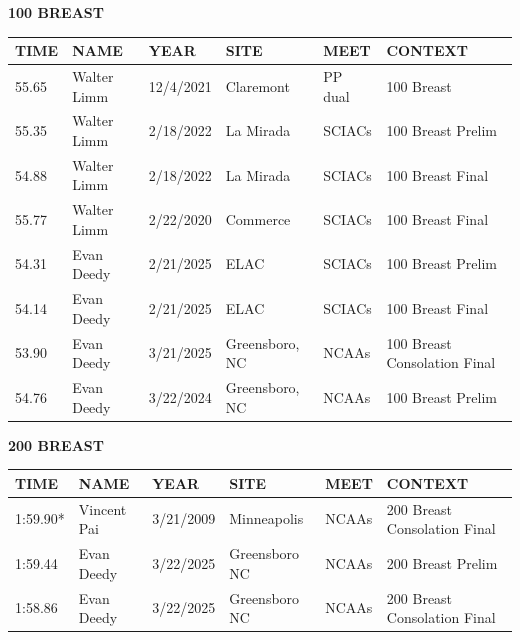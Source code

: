 \begin{table}[H]
\centering
\begin{minipage}[t]{0.48\textwidth}
\centering
\textbf{100 BREAST}\\[0.1cm]
\begin{tabular}{@{}p{1.8cm}p{2.8cm}p{1.2cm}p{1.4cm}p{1.4cm}p{2.0cm}@{}}
\hline
    \textbf{TIME} & \textbf{NAME} & \textbf{YEAR} & \textbf{SITE} & \textbf{MEET} & \textbf{CONTEXT} \\
\hline
    55.65 & Walter Limm & 12/4/2021 & Claremont & PP dual & 100 Breast \\
    55.35 & Walter Limm & 2/18/2022 & La Mirada & SCIACs & 100 Breast Prelim \\
    54.88 & Walter Limm & 2/18/2022 & La Mirada & SCIACs & 100 Breast Final \\
    55.77 & Walter Limm & 2/22/2020 & Commerce & SCIACs & 100 Breast Final \\
    54.31 & Evan Deedy & 2/21/2025 & ELAC & SCIACs & 100 Breast Prelim \\
    54.14 & Evan Deedy & 2/21/2025 & ELAC & SCIACs & 100 Breast Final \\
    53.90 & Evan Deedy & 3/21/2025 & Greensboro, NC & NCAAs & 100 Breast Consolation Final \\
    54.76 & Evan Deedy & 3/22/2024 & Greensboro, NC & NCAAs & 100 Breast Prelim \\
\hline
\end{tabular}
\end{minipage}\hfill
\begin{minipage}[t]{0.48\textwidth}
\centering
\textbf{200 BREAST}\\[0.1cm]
\begin{tabular}{@{}p{1.8cm}p{2.8cm}p{1.2cm}p{1.4cm}p{1.4cm}p{2.0cm}@{}}
\hline
    \textbf{TIME} & \textbf{NAME} & \textbf{YEAR} & \textbf{SITE} & \textbf{MEET} & \textbf{CONTEXT} \\
\hline
    1:59.90* & Vincent Pai & 3/21/2009 & Minneapolis & NCAAs & 200 Breast Consolation Final \\
    1:59.44 & Evan Deedy & 3/22/2025 & Greensboro NC & NCAAs & 200 Breast Prelim \\
    1:58.86 & Evan Deedy & 3/22/2025 & Greensboro NC & NCAAs & 200 Breast Consolation Final \\
\hline
\end{tabular}
\end{minipage}
\end{table}

